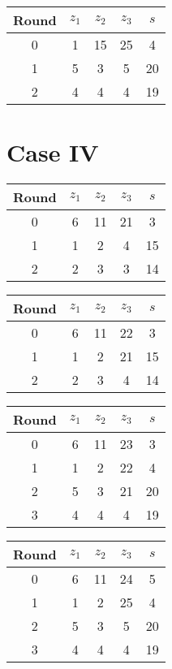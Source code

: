 \begin{table}
\begin{tabular}{c | c | c | c | c }
Round & $z_1$ & $z_2$ & $z_3$ & $s$ \\
\hline
0 & 1 & 15 & 25 & 4 \\
1 & 5 & 3 & 5 & 20 \\
2 & 4 & 4 & 4 & 19
\end{tabular}
\end{table}


\section{Case IV}

\begin{table}
\begin{tabular}{c | c | c | c | c }
Round & $z_1$ & $z_2$ & $z_3$ & $s$ \\
\hline
0 & 6 & 11 & 21 & 3 \\
1 & 1 & 2 & 4 & 15 \\
2 & 2 & 3 & 3 & 14
\end{tabular}
\end{table}

\begin{table}
\begin{tabular}{c | c | c | c | c }
Round & $z_1$ & $z_2$ & $z_3$ & $s$ \\
\hline
0 & 6 & 11 & 22 & 3 \\
1 & 1 & 2 & 21 & 15 \\
2 & 2 & 3 & 4 & 14
\end{tabular}
\end{table}

\begin{table}
\begin{tabular}{c | c | c | c | c }
Round & $z_1$ & $z_2$ & $z_3$ & $s$ \\
\hline
0 & 6 & 11 & 23 & 3 \\
1 & 1 & 2 & 22 & 4 \\
2 & 5 & 3 & 21 & 20 \\
3 & 4 & 4 & 4 & 19
\end{tabular}
\end{table}

\begin{table}
\begin{tabular}{c | c | c | c | c }
Round & $z_1$ & $z_2$ & $z_3$ & $s$ \\
\hline
0 & 6 & 11 & 24 & 5 \\
1 & 1 & 2 & 25 & 4 \\
2 & 5 & 3 & 5 & 20 \\
3 & 4 & 4 & 4 & 19
\end{tabular}
\end{table}

